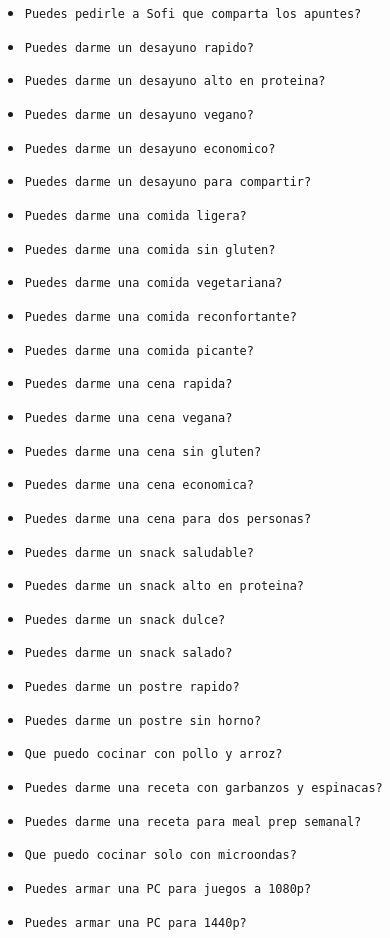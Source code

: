\documentclass[a4paper,12pt]{article}
\begin{document}
\begin{itemize}
    \item \texttt{Puedes pedirle a Sofi que comparta los apuntes?}
    \item \texttt{Puedes darme un desayuno rapido?}
    \item \texttt{Puedes darme un desayuno alto en proteina?}
    \item \texttt{Puedes darme un desayuno vegano?}
    \item \texttt{Puedes darme un desayuno economico?}
    \item \texttt{Puedes darme un desayuno para compartir?}
    \item \texttt{Puedes darme una comida ligera?}
    \item \texttt{Puedes darme una comida sin gluten?}
    \item \texttt{Puedes darme una comida vegetariana?}
    \item \texttt{Puedes darme una comida reconfortante?}
    \item \texttt{Puedes darme una comida picante?}
    \item \texttt{Puedes darme una cena rapida?}
    \item \texttt{Puedes darme una cena vegana?}
    \item \texttt{Puedes darme una cena sin gluten?}
    \item \texttt{Puedes darme una cena economica?}
    \item \texttt{Puedes darme una cena para dos personas?}
    \item \texttt{Puedes darme un snack saludable?}
    \item \texttt{Puedes darme un snack alto en proteina?}
    \item \texttt{Puedes darme un snack dulce?}
    \item \texttt{Puedes darme un snack salado?}
    \item \texttt{Puedes darme un postre rapido?}
    \item \texttt{Puedes darme un postre sin horno?}
    \item \texttt{Que puedo cocinar con pollo y arroz?}
    \item \texttt{Puedes darme una receta con garbanzos y espinacas?}
    \item \texttt{Puedes darme una receta para meal prep semanal?}
    \item \texttt{Que puedo cocinar solo con microondas?}
    \item \texttt{Puedes armar una PC para juegos a 1080p?}
    \item \texttt{Puedes armar una PC para 1440p?}

\end{itemize}
\end{document}

